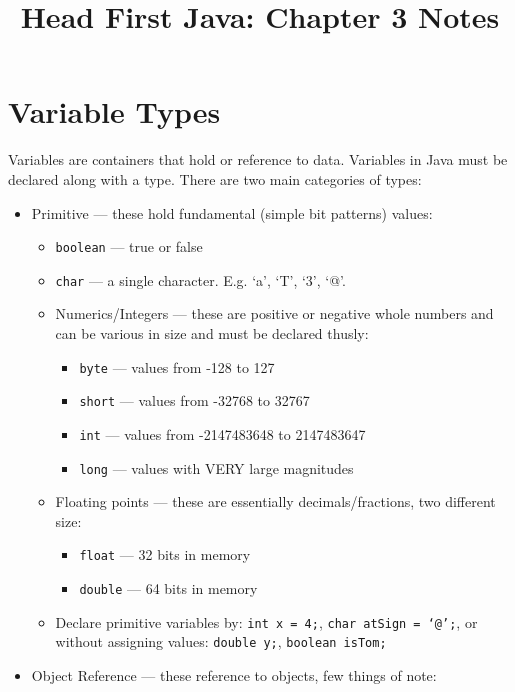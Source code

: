 \documentclass{tufte-handout}
\title{Head First Java: Chapter 3 Notes}
\begin{document}
    \maketitle

    \section*{Variable Types}
    Variables are containers that hold or reference to data. Variables in Java must be declared along with a type. There are two main categories of types:

    \begin{itemize}
        \item Primitive --- these hold fundamental (simple bit patterns) values:
        \begin{itemize}
            \item \texttt{boolean} --- true or false
            \item \texttt{char} --- a single character. E.g. `a', `T', `3', `@'.
            \item Numerics/Integers --- these are positive or negative whole numbers and can be various in size and must be declared thusly:
            \begin{itemize}
                \item \texttt{byte} --- values from -128 to 127
                \item \texttt{short} --- values from -32768 to 32767
                \item \texttt{int} --- values from -2147483648 to 2147483647
                \item \texttt{long} --- values with VERY large magnitudes
            \end{itemize}
            \item Floating points --- these are essentially decimals/fractions, two different size:
            \begin{itemize}
                \item \texttt{float} --- 32 bits in memory
                \item \texttt{double} --- 64 bits in memory
            \end{itemize}
        \item Declare primitive variables by: \texttt{int x = 4;}, \texttt{char atSign = `@';}, or without assigning values: \texttt{double y;}, \texttt{boolean isTom;}
        \end{itemize}
        \item Object Reference --- these reference to objects, few things of note:

\end{itemize}
\end{document}
